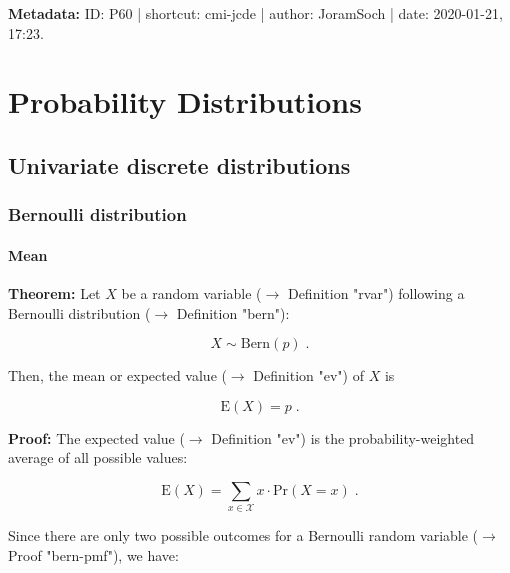 \documentclass[a4paper,12pt]{book}
\begin{document}
\vspace{1em}
\textbf{Metadata:} ID: P60 | shortcut: cmi-jcde | author: JoramSoch | date: 2020-01-21, 17:23.




\chapter{Probability Distributions} \label{sec:Probability Distributions} \newpage

\pagebreak
\section{Univariate discrete distributions}

\subsection{Bernoulli distribution}

\subsubsection[\textbf{Mean}]{Mean} \label{sec:bern-mean}

\vspace{1em}
\textbf{Theorem:} Let $X$ be a random variable ($\rightarrow$ Definition "rvar") following a Bernoulli distribution ($\rightarrow$ Definition "bern"):

\begin{equation} \label{eq:bern-mean-bern}
X \sim \mathrm{Bern}(p) \; .
\end{equation}

Then, the mean or expected value ($\rightarrow$ Definition "ev") of $X$ is

\begin{equation} \label{eq:bern-mean-bern-mean}
\mathrm{E}(X) = p \; .
\end{equation}


\vspace{1em}
\textbf{Proof:} The expected value ($\rightarrow$ Definition "ev") is the probability-weighted average of all possible values:

\begin{equation} \label{eq:bern-mean-mean}
\mathrm{E}(X) = \sum_{x \in \mathcal{X}} x \cdot \mathrm{Pr}(X = x) \; .
\end{equation}

Since there are only two possible outcomes for a Bernoulli random variable ($\rightarrow$ Proof "bern-pmf"), we have:
\end{document}
